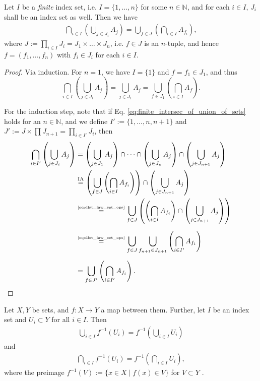 \begin{theorem}\label{thrm:finite_intersec_of_union_of_sets}
	Let $I$ be a \textit{finite} index set, i.e. $I = \{1, \dots, n\}$ for some $n\in \mathbb N$, and for each $i\in I$, $J_i$ shall be an index set as well. Then we have
	\begin{align}\label{eq:finite_intersec_of_union_of_sets}
		\bigcap_{i\in I}\left(\bigcup_{j\in J_i}A_j\right) = \bigcup_{f\in J}\left(\bigcap_{i\in I}A_{f_i}\right),
	\end{align}
	where $J := \prod_{i\in I}J_i = J_1\times \dots\times J_n$, i.e. $f\in J$ is an $n$-tuple, and hence $f = (f_1, \dots, f_n)$ with $f_i\in J_i$ for each $i\in I$.
\end{theorem}

\begin{proof}
	Via induction. For $n = 1$, we have $I = \{1\}$ and $f = f_1\in J_1$, and thus
	$$\bigcap_{i\in I}\left(\bigcup_{j\in J_i}A_j\right) = \bigcup_{j\in J_1} A_j = \bigcup_{f\in J_1}\left(\bigcap_{i\in I}A_{f}\right).$$
	
	For the induction step, note that if Eq. \eqref{eq:finite_intersec_of_union_of_sets} holds for an $n\in\mathbb N$, and we define $I' := \{1, \dots, n, n+1\}$ and $J' := J\times\prod J_{n+1} = \prod_{i\in I'}J_i$, then
	\begin{align*}
		\bigcap_{i\in I'}\left(\bigcup_{j\in J_i}A_j\right) 
		&= \left( \bigcup_{j\in J_1}A_j \right) \cap \dots\cap \left(\bigcup_{j\in J_n}A_j\right)\cap \left(\bigcup_{j\in J_{n+1}}A_j\right) 
		\\ &\overset{\small\text{IA}}{=} \left(\bigcup_{f\in J}\left(\bigcap_{i\in I}A_{f_i}\right)\right) \cap \left(\bigcup_{j\in J_{n+1}}A_j\right) 
		\\ &\overset{\tiny\eqref{eq:dist_law_set_ops}}{=} \bigcup_{f\in J}\left(\left( \bigcap_{i\in I}A_{f_i}\right) \cap \left( \bigcup_{j\in J_{n+1}}A_j \right)\right)
		\\[6pt] &\overset{\tiny\eqref{eq:dist_law_set_ops}}{=} \bigcup_{f\in J}\bigcup_{f_{n+1}\in J_{n+1}} \left( \bigcap_{i\in I'}A_{f_i}\right)
		\\[6pt] &= \bigcup_{f\in J'}\left( \bigcap_{i\in I'}A_{f_i}\right).
	\end{align*}
\end{proof}

\begin{theorem}\label{thrm:set_theory_unions_intersects_preimages}
	Let $X, Y$ be sets, and $f: X\to Y$ a map between them. Further, let $I$ be an index set and $U_i\subset Y$ for all $i\in I$. Then
	\begin{align}\label{eq:set_theory_unions_preimages}
		\bigcup_{i\in I}f^{-1}(U_i) = f^{-1}\left(\bigcup_{i\in I}U_i\right)
	\end{align}
	and
	\begin{align}\label{eq:set_theory_intersects_preimages}
		\bigcap_{i\in I}f^{-1}(U_i) = f^{-1}\left(\bigcap_{i\in I}U_i\right),
	\end{align}
	where the preimage $f^{-1}(V) := \{x\in X\mid f(x)\in V\}$ for $V\subset Y$ \cite{141357,2190480}.
\end{theorem}

